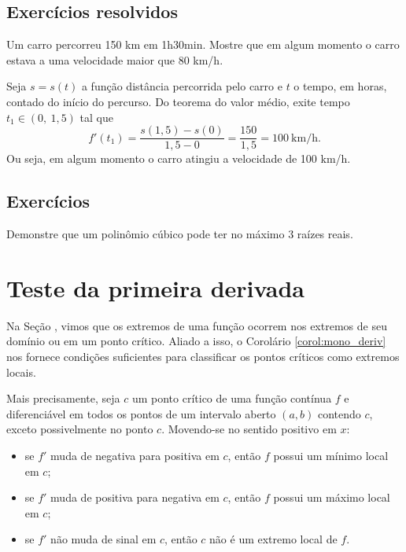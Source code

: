 \subsection*{Exercícios resolvidos}

\begin{exeresol}
  Um carro percorreu 150 km em 1h30min. Mostre que em algum momento o carro estava a uma velocidade maior que 80 km/h.
\end{exeresol}
\begin{resol}
  Seja $s=s(t)$ a função distância percorrida pelo carro e $t$ o tempo, em horas, contado do início do percurso. Do teorema do valor médio, exite tempo $t_1\in (0,~1,5)$ tal que
  \begin{equation}
    f'(t_1) = \frac{s(1,5)-s(0)}{1,5-0} = \frac{150}{1,5} = 100~\text{km/h}.
  \end{equation}
  Ou seja, em algum momento o carro atingiu a velocidade de 100 km/h.
\end{resol}

\emconstrucao

\subsection*{Exercícios}

\begin{exer}
  Demonstre que um polinômio cúbico pode ter no máximo $3$ raízes reais.
\end{exer}

\section{Teste da primeira derivada}\label{cap_apderiv_sec_tder1}

Na Seção \label{cap_apderiv_sec_tder1}, vimos que os extremos de uma função ocorrem nos extremos de seu domínio ou em um ponto crítico. Aliado a isso, o Corolário \ref{corol:mono_deriv} nos fornece condições suficientes para classificar os pontos críticos como extremos locais.

Mais precisamente, seja $c$ um ponto crítico de uma função contínua $f$ e diferenciável em todos os pontos de um intervalo aberto $(a,b)$ contendo $c$, exceto possivelmente no ponto $c$. Movendo-se no sentido positivo em $x$:
\begin{itemize}
\item se $f'$ muda de negativa para positiva em $c$, então $f$ possui um mínimo local em $c$;
\item se $f'$ muda de positiva para negativa em $c$, então $f$ possui um máximo local em $c$;
\item se $f'$ não muda de sinal em $c$, então $c$ não é um extremo local de $f$.
\end{itemize}

